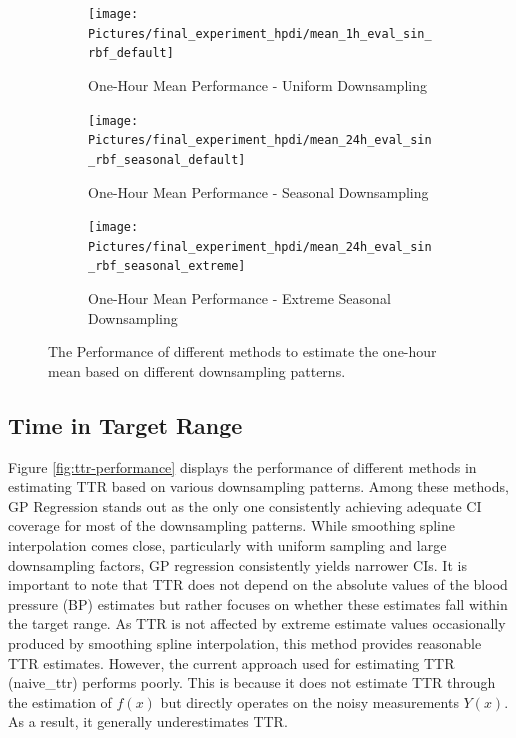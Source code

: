 \begin{figure}[!htb]
\centering
\begin{subfigure}{\textwidth}
    \centering
    \texttt{[image: Pictures/final\_experiment\_hpdi/mean\_1h\_eval\_sin\_rbf\_default]}
    \caption{One-Hour Mean Performance - Uniform Downsampling}
    \label{fig:hourly-mean-uniform-sampling-performance}
\end{subfigure}

\bigskip

\begin{subfigure}{\textwidth}
    \centering
    \texttt{[image: Pictures/final\_experiment\_hpdi/mean\_24h\_eval\_sin\_rbf\_seasonal\_default]}
    \caption{One-Hour Mean Performance - Seasonal Downsampling}
    \label{fig:hourly-mean-seasonal-sampling-performance}
\end{subfigure}

\bigskip

\begin{subfigure}{\textwidth}
    \centering
    \texttt{[image: Pictures/final\_experiment\_hpdi/mean\_24h\_eval\_sin\_rbf\_seasonal\_extreme]}
    \caption{One-Hour Mean Performance - Extreme Seasonal Downsampling}
    \label{fig:hourly-mean-extreme-seasonal-sampling-performance}
\end{subfigure}

\caption[One-Hour Mean Performance]{The Performance of different methods to
estimate the one-hour mean based on different downsampling patterns.
}
\label{fig:hourly-mean-performance}
\end{figure}


\subsection{Time in Target Range}\label{subsec:time-in-target-range}

Figure \ref{fig:ttr-performance} displays the performance of different methods
in estimating TTR based on various downsampling patterns.
Among these methods, GP Regression stands out as the only one consistently achieving
adequate CI coverage for most of the downsampling patterns.
While smoothing spline interpolation comes close, particularly with uniform sampling and
large downsampling factors, GP regression consistently yields narrower CIs.
It is important to note that TTR does not depend on the absolute values of the blood pressure (BP)
estimates but rather focuses on whether these estimates fall within the target range.
As TTR is not affected by extreme estimate values occasionally produced by smoothing spline interpolation,
this method provides reasonable TTR estimates.
However, the current approach used for estimating TTR (naive\_ttr) performs poorly.
This is because it does not estimate TTR through the estimation of $f(x)$ but directly
operates on the noisy measurements $Y(x)$. As a result, it generally underestimates TTR.


